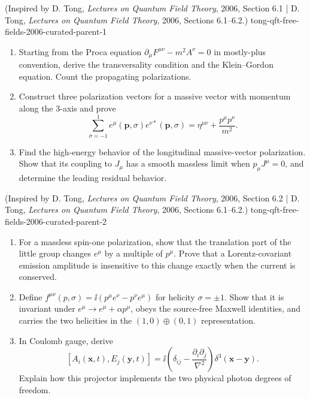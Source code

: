 \begin{enumerate}
  {(Inspired by D. Tong, \emph{Lectures on Quantum Field Theory}, 2006, Section 6.1 | D. Tong, \emph{Lectures on Quantum Field Theory}, 2006, Sections 6.1--6.2.)}
  {tong-qft-free-fields-2006-curated-parent-1}
\begin{enumerate}
\item
Starting from the Proca equation
\(\partial_\mu F^{\mu\nu}-m^2A^\nu=0\) in mostly-plus convention, derive
the transversality condition and the Klein--Gordon equation.  Count the
propagating polarizations.
\item
Construct three polarization vectors for a massive vector with momentum
along the 3-axis and prove
\[
 \sum_{\sigma=-1}^{1}e^\mu(\mathbf p,\sigma)
 e^{\nu *}(\mathbf p,\sigma)
 =\eta^{\mu\nu}+\frac{p^\mu p^\nu}{m^2}.
\]
\item
Find the high-energy behavior of the longitudinal massive-vector
polarization.  Show that its coupling to \(J_\mu\) has a smooth massless
limit when \(p_\mu J^\mu=0\), and determine the leading residual behavior.
\end{enumerate}

  {(Inspired by D. Tong, \emph{Lectures on Quantum Field Theory}, 2006, Section 6.2 | D. Tong, \emph{Lectures on Quantum Field Theory}, 2006, Sections 6.1--6.2.)}
  {tong-qft-free-fields-2006-curated-parent-2}
\begin{enumerate}
\item
For a massless spin-one polarization, show that the translation part of the
little group changes \(e^\mu\) by a multiple of \(p^\mu\).  Prove that a
Lorentz-covariant emission amplitude is insensitive to this change exactly
when the current is conserved.
\item
Define
\(f^{\mu\nu}(p,\sigma)=\ii(p^\mu e^\nu-p^\nu e^\mu)\)
for helicity \(\sigma=\pm1\).  Show that it is invariant under
\(e^\mu\to e^\mu+\alpha p^\mu\), obeys the source-free Maxwell identities,
and carries the two helicities in the
\((1,0)\oplus(0,1)\) representation.
\item
In Coulomb gauge, derive
\[
 [A_i(\mathbf x,t),E_j(\mathbf y,t)]
 =\ii\left(\delta_{ij}-\frac{\partial_i\partial_j}{\nabla^2}\right)
 \delta^3(\mathbf x-\mathbf y).
\]
Explain how this projector implements the two physical photon degrees of
freedom.
\end{enumerate}


\end{enumerate}
